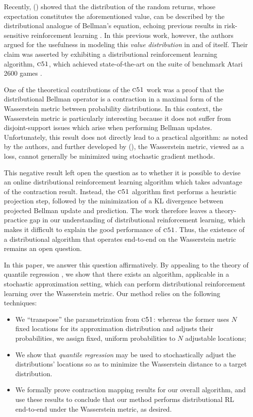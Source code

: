 \documentclass[letterpaper]{article}
\def \cfo {\textsc{c51}}
\newcommand{\citet}[1]{\citeauthor{#1} (\citeyear{#1})}
\begin{document}
Recently, \citet{c51} showed that the distribution of the random returns, whose expectation constitutes the aforementioned value, can be described by the distributional analogue of Bellman's equation, echoing previous results in risk-sensitive reinforcement learning \cite{heger1994consideration,morimura10parametric,chow2015risk}. In this previous work, however, the authors argued for the usefulness in modeling this \emph{value distribution} in and of itself. Their claim was asserted by exhibiting a distributional reinforcement learning algorithm, $\cfo$, which achieved state-of-the-art on the suite of benchmark Atari 2600 games \cite{bellemare13arcade}.

One of the theoretical contributions of the $\cfo$ work was a proof that the distributional Bellman operator is a contraction in a maximal form of the Wasserstein metric between probability distributions. In this context, the Wasserstein metric is particularly interesting because it does not suffer from disjoint-support issues \cite{wgan} which arise when performing Bellman updates. Unfortunately, this result does not directly lead to a practical algorithm: as noted by the authors, and further developed by \citet{bellemare17cramer}, the Wasserstein metric, viewed as a loss, cannot generally be minimized using stochastic gradient methods. 

This negative result left open the question as to whether it is possible to devise an online distributional reinforcement learning algorithm which takes advantage of the contraction result. Instead, the $\cfo$ algorithm first performs a heuristic projection step, followed by the minimization of a KL divergence between projected Bellman update and prediction. The work therefore leaves a theory-practice gap in our understanding of distributional reinforcement learning, which makes it difficult to explain the good performance of $\cfo$. Thus, the existence of a distributional algorithm that operates end-to-end on the Wasserstein metric remains an open question.

In this paper, we answer this question affirmatively. By appealing to the theory of quantile regression \cite{qrbook}, we show that there exists an algorithm, applicable in a stochastic approximation setting, which can perform distributional reinforcement learning over the Wasserstein metric. Our method relies on the following techniques:
\begin{itemize}
    \item We ``transpose'' the parametrization from $\cfo$: whereas the former uses $N$ fixed locations for its approximation distribution and adjusts their probabilities, we assign fixed, uniform probabilities to $N$ adjustable locations;
    \item We show that \emph{quantile regression} may be used to stochastically adjust the distributions' locations so as to minimize the Wasserstein distance to a target distribution.
    \item We formally prove contraction mapping results for our overall algorithm, and use these results to conclude that our method performs distributional RL end-to-end under the Wasserstein metric, as desired.
\end{itemize}
\end{document}
